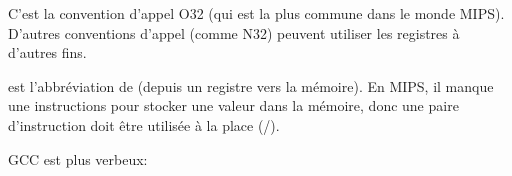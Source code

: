 C'est la convention d'appel O32 (qui est la plus commune dans le monde MIPS).
D'autres conventions d'appel (comme N32) peuvent utiliser les registres à d'autres fins.


 est l'abbréviation de  (depuis un registre vers la mémoire).
En MIPS, il manque une instructions pour stocker une valeur dans la mémoire, donc
une paire d'instruction doit être utilisée à la place (/).






GCC \NonOptimizing est plus verbeux:





